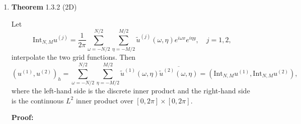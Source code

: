 \documentclass[12pt]{article}
\begin{document}
\begin{enumerate}
        \item   \textbf{Theorem} 1.3.2 (2D)

                Let
                \begin{equation*}
                    \text{Int}_{N,M} u^{(j)} = \frac{1}{2\pi} \sum_{\omega=-N/2}^{N/2} \sum_{\eta=-M/2}^{M/2} \tilde{u}^{(j)}(\omega, \eta) e^{i\omega x} e^{i\eta y}, \quad j = 1, 2,
                \end{equation*}
                interpolate the two grid functions. Then
                \begin{equation*}
                    (u^{(1)}, u^{(2)})_h = \sum_{\omega=-N/2}^{N/2} \sum_{\eta=-M/2}^{M/2} \tilde{u}^{(1)}(\omega, \eta) \overline{\tilde{u}^{(2)}(\omega, \eta)} = (\text{Int}_{N,M} u^{(1)}, \text{Int}_{N,M} u^{(2)}),
                \end{equation*}
                where the left-hand side is the discrete inner product and the right-hand side is the continuous $L^2$ inner product over $[0, 2\pi] \times [0, 2\pi]$.

                \textbf{Proof:}
  

\end{enumerate}
\end{document}
